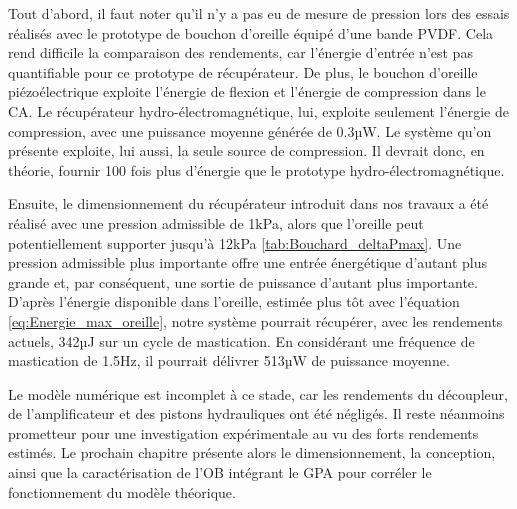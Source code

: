 Tout d'abord, il faut noter qu'il n'y a pas eu de mesure de pression lors des essais réalisés avec le prototype de bouchon d'oreille équipé d'une bande PVDF. Cela rend difficile la comparaison des rendements, car l'énergie d'entrée n'est pas quantifiable pour ce prototype de récupérateur. De plus, le bouchon d'oreille piézoélectrique exploite l'énergie de flexion et l'énergie de compression dans le CA. Le récupérateur hydro-électromagnétique, lui, exploite seulement l'énergie de compression, avec une puissance moyenne générée de 0.3µW. Le système qu'on présente exploite, lui aussi, la seule source de compression. Il devrait donc, en théorie, fournir 100 fois plus d'énergie que le prototype hydro-électromagnétique. 

Ensuite, le dimensionnement du récupérateur introduit dans nos travaux a été réalisé avec une pression admissible de 1kPa, alors que l'oreille peut potentiellement supporter jusqu'à 12kPa \ref{tab:Bouchard_deltaPmax}. Une pression admissible plus importante offre une entrée énergétique d'autant plus grande et, par conséquent, une sortie de puissance d'autant plus importante. D'après l'énergie disponible dans l'oreille, estimée plus tôt avec l'équation \ref{eq:Energie_max_oreille}, notre système pourrait récupérer, avec les rendements actuels, 342µJ sur un cycle de mastication. En considérant une fréquence de mastication de 1.5Hz, il pourrait délivrer 513µW de puissance moyenne.

Le modèle numérique est incomplet à ce stade, car les rendements du découpleur, de l'amplificateur et des pistons hydrauliques ont été négligés. Il reste néanmoins prometteur pour une investigation expérimentale au vu des forts rendements estimés. Le prochain chapitre présente alors le dimensionnement, la conception, ainsi que la caractérisation de l'OB intégrant le GPA pour corréler le fonctionnement du modèle théorique.
